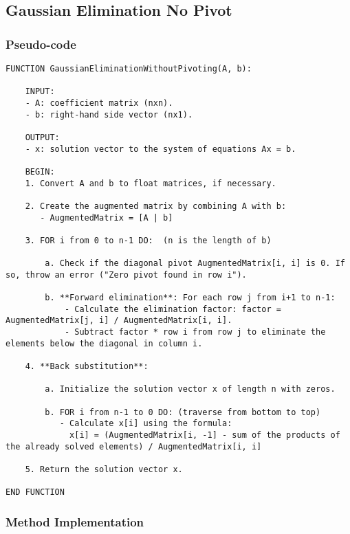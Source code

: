\documentclass{article}
\begin{document}
    \subsection{Gaussian Elimination No Pivot}
        \subsubsection{Pseudo-code}
\begin{lstlisting}
FUNCTION GaussianEliminationWithoutPivoting(A, b):

    INPUT:
    - A: coefficient matrix (nxn).
    - b: right-hand side vector (nx1).

    OUTPUT:
    - x: solution vector to the system of equations Ax = b.

    BEGIN:
    1. Convert A and b to float matrices, if necessary.

    2. Create the augmented matrix by combining A with b:
       - AugmentedMatrix = [A | b]

    3. FOR i from 0 to n-1 DO:  (n is the length of b)

        a. Check if the diagonal pivot AugmentedMatrix[i, i] is 0. If so, throw an error ("Zero pivot found in row i").

        b. **Forward elimination**: For each row j from i+1 to n-1:
            - Calculate the elimination factor: factor = AugmentedMatrix[j, i] / AugmentedMatrix[i, i].
            - Subtract factor * row i from row j to eliminate the elements below the diagonal in column i.

    4. **Back substitution**:

        a. Initialize the solution vector x of length n with zeros.

        b. FOR i from n-1 to 0 DO: (traverse from bottom to top)
           - Calculate x[i] using the formula:
             x[i] = (AugmentedMatrix[i, -1] - sum of the products of the already solved elements) / AugmentedMatrix[i, i]

    5. Return the solution vector x.

END FUNCTION
\end{lstlisting}

        \subsubsection{Method Implementation}
\end{document}
